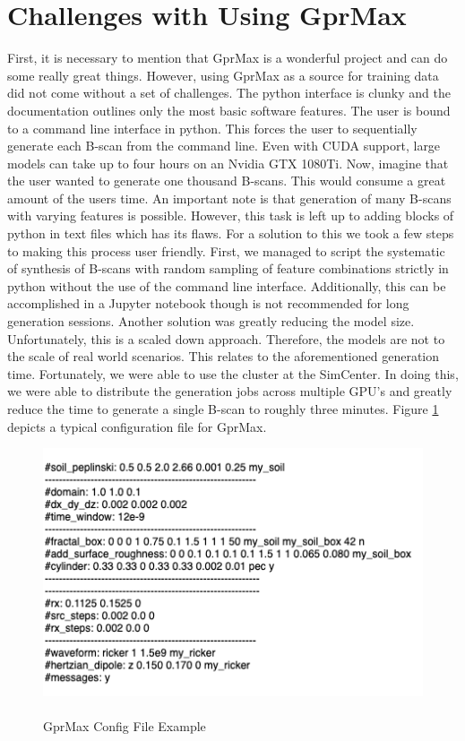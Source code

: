 \section{Challenges with Using GprMax}
\hspace{0.5in}First, it is necessary to mention that GprMax is a wonderful project and can do some really great things. However, using GprMax as a source for training data did not come without a set of challenges. The python interface is clunky and the documentation outlines only the most basic software features. The user is bound to a command line interface in python. This forces the user to sequentially generate each B-scan from the command line. Even with CUDA support, large models can take up to four hours on an Nvidia GTX 1080Ti. Now, imagine that the user wanted to generate one thousand B-scans. This would consume a great amount of the users time. An important note is that generation of many B-scans with varying features is possible. However, this task is left up to adding blocks of python in text files which has its flaws. For a solution to this we took a few steps to making this process user friendly. First, we managed to script the systematic of synthesis of B-scans with random sampling of feature combinations strictly in python without the use of the command line interface. Additionally, this can be accomplished in a Jupyter notebook though is not recommended for long generation sessions. Another solution was greatly reducing the model size. Unfortunately, this is a scaled down approach. Therefore, the models are not to the scale of real world scenarios. This relates to the aforementioned generation time. Fortunately, we were able to use the cluster at the SimCenter. In doing this, we were able to distribute the generation jobs across multiple GPU's and greatly reduce the time to generate a single B-scan to roughly three minutes. Figure \ref{fig:config_examlple} depicts a typical configuration file for GprMax.

\vspace{0.5\baselineskip}

\begin{figure}[H]
    \centering
    \includegraphics[width=\linewidth]{figures/config_example.png}
    
    \caption{\\GprMax Config File Example}
    \label{fig:config_examlple}
\end{figure}

